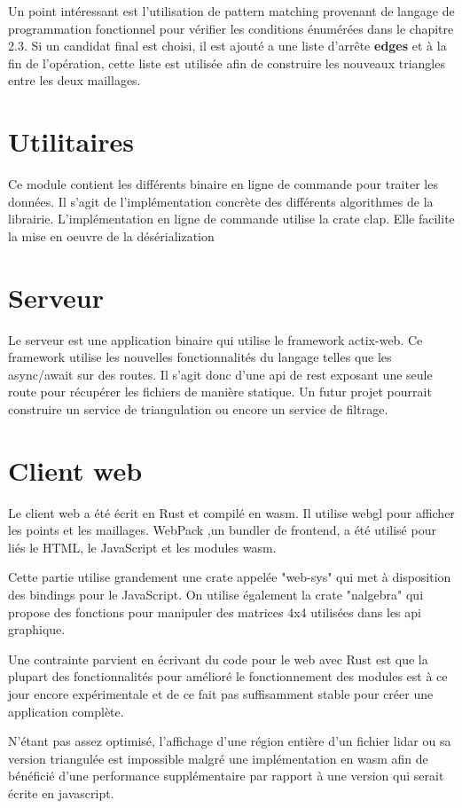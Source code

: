 Un point intéressant est l'utilisation de pattern matching provenant de langage de programmation fonctionnel pour vérifier les conditions énumérées dans le chapitre 2.3. Si un candidat final est choisi, il est ajouté a une liste d'arrête \textbf{edges} et à la fin de l'opération, cette liste est utilisée afin de construire les nouveaux triangles entre les deux maillages.

\section{Utilitaires}

Ce module contient les différents binaire en ligne de commande pour traiter les données. Il s'agit de l'implémentation concrète des différents algorithmes de la librairie. L'implémentation en ligne de commande utilise la crate clap. Elle facilite la mise en oeuvre de la désérialization 

\section{Serveur}

Le serveur est une application binaire qui utilise le framework actix-web. Ce framework utilise les nouvelles fonctionnalités du langage telles que les async/await sur des routes. Il s'agit donc d'une \gls{api} de \gls{rest} exposant une seule route pour récupérer les fichiers de manière statique. Un futur projet pourrait construire un service de triangulation ou encore un service de filtrage.

\section{Client web}

Le client web a été écrit en Rust et compilé en \gls{wasm}. Il utilise webgl pour afficher les points et les maillages. WebPack ,un bundler de frontend, a été utilisé pour liés le HTML, le JavaScript et les modules \gls{wasm}. 

Cette partie utilise grandement une crate appelée "web-sys" qui met à disposition des bindings pour le JavaScript.
On utilise également la crate "nalgebra" qui propose des fonctions pour manipuler des matrices 4x4 utilisées dans les \gls{api} graphique.

Une contrainte parvient en écrivant du code pour le web avec Rust est que la plupart des fonctionnalités pour amélioré le fonctionnement des modules est à ce jour encore expérimentale et de ce fait pas suffisamment stable pour créer une application complète.

N'étant pas assez optimisé, l'affichage d'une région entière d'un fichier \gls{lidar} ou sa version triangulée est impossible malgré une implémentation en \gls{wasm} afin de bénéficié d'une performance supplémentaire par rapport à une version qui serait écrite en javascript.
